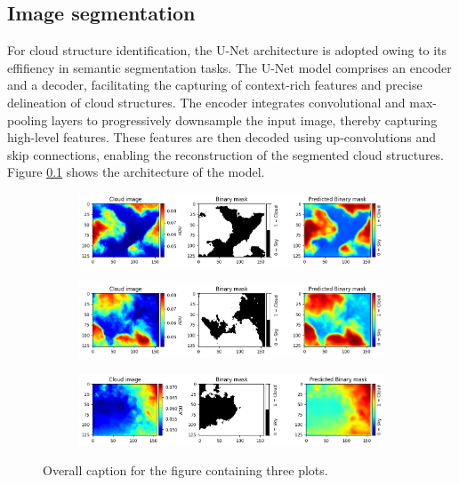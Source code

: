 \documentclass{article}
\begin{document}
\subsection{Image segmentation}

For cloud structure identification, the U-Net architecture is adopted owing to its effifiency in semantic segmentation tasks. The U-Net model comprises an encoder and a decoder, facilitating the capturing of context-rich features and precise delineation of cloud structures. The encoder integrates convolutional and max-pooling layers to progressively downsample the input image, thereby capturing high-level features. These features are then decoded using up-convolutions and skip connections, enabling the reconstruction of the segmented cloud structures. Figure \ref{} shows the architecture of the model.

\begin{figure}[!h]
    \centering
    
    \begin{subfigure}{\textwidth}
        \centering
        \includegraphics[width=1.0\linewidth]{figures/test_dl_15epochs.png}
        \label{fig:sub1}
    \end{subfigure}
    
    \begin{subfigure}{\textwidth}
        \centering
        \includegraphics[width=1.0\linewidth]{figures/test_dl_15epochs2.png}
        \label{fig:sub2}
    \end{subfigure}
    
    \begin{subfigure}{\textwidth}
        \centering
        \includegraphics[width=1.0\linewidth]{figures/test_dl_15epochs3.png}
        \label{fig:sub3}
    \end{subfigure}

    \caption{Overall caption for the figure containing three plots.}
    \label{fig:all}
\end{figure}
\end{document}
